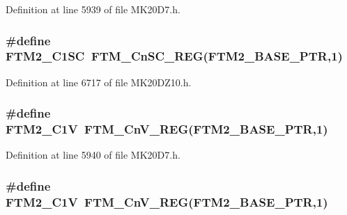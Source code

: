 Definition at line 5939 of file M\+K20\+D7.\+h.

\subsubsection[{\texorpdfstring{F\+T\+M2\+\_\+\+C1\+SC}{FTM2_C1SC}}]{\setlength{\rightskip}{0pt plus 5cm}\#define F\+T\+M2\+\_\+\+C1\+SC~{\bf F\+T\+M\+\_\+\+Cn\+S\+C\+\_\+\+R\+EG}({\bf F\+T\+M2\+\_\+\+B\+A\+S\+E\+\_\+\+P\+TR},1)}\hypertarget{group___f_t_m___register___accessor___macros_gae00fff26b9421f4023842bf031c833b4}{}\label{group___f_t_m___register___accessor___macros_gae00fff26b9421f4023842bf031c833b4}


Definition at line 6717 of file M\+K20\+D\+Z10.\+h.

\subsubsection[{\texorpdfstring{F\+T\+M2\+\_\+\+C1V}{FTM2_C1V}}]{\setlength{\rightskip}{0pt plus 5cm}\#define F\+T\+M2\+\_\+\+C1V~{\bf F\+T\+M\+\_\+\+Cn\+V\+\_\+\+R\+EG}({\bf F\+T\+M2\+\_\+\+B\+A\+S\+E\+\_\+\+P\+TR},1)}\hypertarget{group___f_t_m___register___accessor___macros_ga5556a11ef7048216dc1f55467c062e60}{}\label{group___f_t_m___register___accessor___macros_ga5556a11ef7048216dc1f55467c062e60}


Definition at line 5940 of file M\+K20\+D7.\+h.

\subsubsection[{\texorpdfstring{F\+T\+M2\+\_\+\+C1V}{FTM2_C1V}}]{\setlength{\rightskip}{0pt plus 5cm}\#define F\+T\+M2\+\_\+\+C1V~{\bf F\+T\+M\+\_\+\+Cn\+V\+\_\+\+R\+EG}({\bf F\+T\+M2\+\_\+\+B\+A\+S\+E\+\_\+\+P\+TR},1)}\hypertarget{group___f_t_m___register___accessor___macros_ga5556a11ef7048216dc1f55467c062e60}{}\label{group___f_t_m___register___accessor___macros_ga5556a11ef7048216dc1f55467c062e60}


